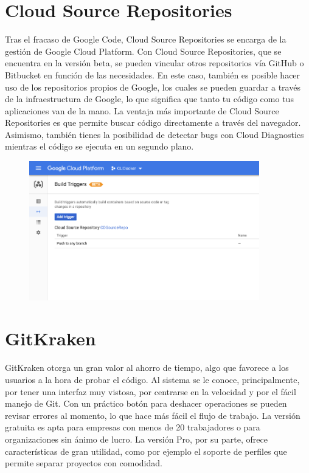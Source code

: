 \documentclass[12pt,letterpaper]{article}
\begin{document}
\section{Cloud Source Repositories}
Tras el fracaso de Google Code, Cloud Source Repositories se encarga de la gestión de Google Cloud Platform. Con Cloud Source Repositories, que se encuentra en la versión beta, se pueden vincular otros repositorios vía GitHub o Bitbucket en función de las necesidades. En este caso, también es posible hacer uso de los repositorios propios de Google, los cuales se pueden guardar a través de la infraestructura de Google, lo que significa que tanto tu código como tus aplicaciones van de la mano.  La ventaja más importante de Cloud Source Repositories es que permite buscar código directamente a través del navegador. Asimismo, también tienes la posibilidad de detectar bugs con Cloud Diagnostics mientras el código se ejecuta en un segundo plano.

\vspace*{-0.025in}
\begin{figure}[htb]
\begin{center}
\includegraphics[width=10cm]{./Imagenes/6}
\end{center}
\end{figure}

\section{GitKraken}
GitKraken otorga un gran valor al ahorro de tiempo, algo que favorece a los usuarios a la hora de probar el código. Al sistema se le conoce, principalmente, por tener una interfaz muy vistosa, por centrarse en la velocidad y por el fácil manejo de Git. Con un práctico botón para deshacer operaciones se pueden revisar errores al momento, lo que hace más fácil el flujo de trabajo. La versión gratuita es apta para empresas con menos de 20 trabajadores o para organizaciones sin ánimo de lucro. La versión Pro, por su parte, ofrece características de gran utilidad, como por ejemplo el soporte de perfiles que permite separar proyectos con comodidad.
\end{document}

